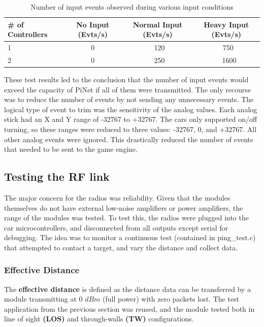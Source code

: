 \documentclass[letterpaper,fleqn]{article}
\begin{document}
\begin{table}[H]
\centering
\caption{Number of input events observed during various input conditions}
\begin{tabular}{| l | c | c | c |} \hline
	\# of Controllers & No Input (Evts/s) & Normal Input (Evts/s) & Heavy Input (Evts/s) \\ \hline
    1 & 0 & ~120 & ~750 \\ \hline
    2 & 0 & ~250 & ~ 1600 \\ \hline
\end{tabular}
\label{tab:input_rate}
\end{table}

These test results led to the conclusion that the number of input events would exceed the capacity of PiNet if all of them were transmitted. The only recourse was to reduce the number of events by not sending any unnecessary events. The logical type of event to trim was the sensitivity of the analog values. Each analog stick had an X and Y range of -32767 to +32767. The cars only supported on/off turning, so these ranges were reduced to three values: -32767, 0, and +32767. All other analog events were ignored. This drastically reduced the number of events that needed to be sent to the game engine.

\subsection{Testing the RF link}
The major concern for the radios was reliability. Given that the modules themselves do not have external low-noise amplifiers or power amplifiers, the range of the modules was tested. To test this, the radios were plugged into the car microcontrollers, and disconnected from all outputs except serial for debugging. The idea was to monitor a continuous test (contained in ping\_test.c) that attempted to contact a target, and vary the distance and collect data.

\subsubsection{Effective Distance}

The \textbf{effective distance} is defined as the distance data can be transferred by a module transmitting at 0 $dBm$ (full power) with zero packets lost. The test application from the previous section was reused, and the module tested both in line of sight \textbf{(LOS)} and through-walls \textbf{(TW)} configurations.
\end{document}
